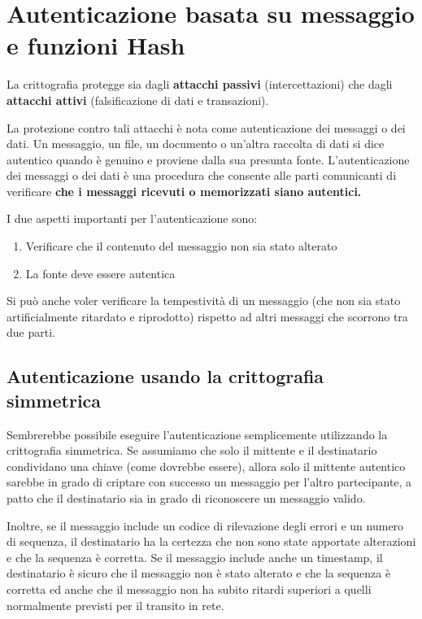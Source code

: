 \section{Autenticazione basata su messaggio e funzioni Hash}
La crittografia protegge sia dagli \textbf{attacchi passivi} (intercettazioni) che dagli \textbf{attacchi attivi} (falsificazione di dati e transazioni). 

\singlespacing

La protezione contro tali attacchi è nota come autenticazione dei messaggi o dei dati. Un messaggio, un file, un documento o un'altra raccolta di dati si dice autentico quando è genuino e proviene dalla sua presunta fonte. L'autenticazione dei messaggi o dei dati è una procedura che consente alle parti comunicanti di verificare \textbf{che i messaggi ricevuti o memorizzati siano autentici.}

\singlespacing

I due aspetti importanti per l'autenticazione sono:

\begin{enumerate}
    \item Verificare che il contenuto del messaggio non sia stato alterato 
    
    \item La fonte deve essere autentica
\end{enumerate}

Si può anche voler verificare la tempestività di un messaggio (che non sia stato artificialmente ritardato e riprodotto) rispetto ad altri messaggi che scorrono tra due parti.

\subsection{Autenticazione usando la crittografia simmetrica}

Sembrerebbe possibile eseguire l'autenticazione semplicemente utilizzando la crittografia simmetrica. Se assumiamo che solo il mittente e il destinatario condividano una chiave (come dovrebbe essere), allora solo il mittente autentico sarebbe in grado di criptare con successo un messaggio per l'altro partecipante, a patto che il destinatario sia in grado di riconoscere un messaggio valido. 

\singlespacing

Inoltre, se il messaggio include un codice di rilevazione degli errori e un numero di sequenza, il destinatario ha la certezza che non sono state apportate alterazioni e che la sequenza è corretta. Se il messaggio include anche un timestamp, il destinatario è sicuro che il messaggio non è stato alterato e che la sequenza è corretta ed anche che il messaggio non ha subito ritardi superiori a quelli normalmente previsti per il transito in rete. 

